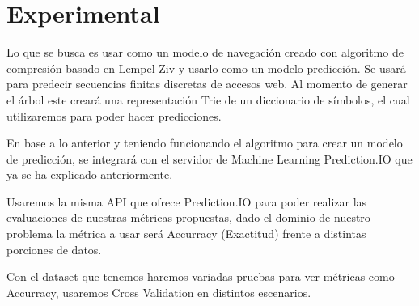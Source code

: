 \chapter[Experimental]{Experimental}



{
}

Lo que se busca es usar como un modelo de navegación creado con algoritmo de compresión basado en Lempel Ziv  y usarlo como un modelo  predicción. Se usará para predecir secuencias finitas discretas de accesos web. Al momento de generar el árbol este creará una representación Trie de un diccionario de símbolos, el cual utilizaremos para poder hacer predicciones.

En base a lo anterior y teniendo funcionando el algoritmo para crear un modelo de predicción, se integrará con el servidor de Machine Learning Prediction.IO que ya se ha explicado anteriormente.



Usaremos la misma API que ofrece Prediction.IO para poder realizar las evaluaciones de nuestras métricas propuestas, dado el dominio de nuestro problema la métrica a usar será Accurracy (Exactitud) frente a distintas porciones de datos.



Con el dataset que tenemos haremos variadas pruebas para ver métricas como Accurracy, usaremos Cross Validation en distintos escenarios.





